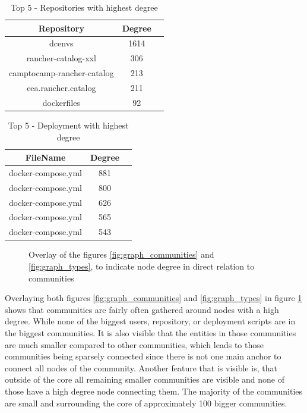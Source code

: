 \begin{table}[h!]
    \centering
    \begin{tabular}{ |c|c|c| }
    \hline
    Repository & Degree \\
    \hline
         dcenvs & 1614\\
         rancher-catalog-xxl & 306\\
         camptocamp-rancher-catalog & 213\\
         eea.rancher.catalog & 211\\
         dockerfiles & 92\\
    \hline
    \end{tabular}
    \caption{Top 5 - Repositories with highest degree}
    \label{table_top_repositories}
\end{table}

\begin{table}[h!]
    \centering
    \begin{tabular}{ |c|c|c| }
    \hline
    FileName & Degree \\
    \hline
         docker-compose.yml & 881\\
         docker-compose.yml & 800\\
         docker-compose.yml & 626\\
         docker-compose.yml & 565\\
         docker-compose.yml & 543\\
    \hline
    \end{tabular}
    \caption{Top 5 - Deployment with highest degree}
    \label{table_top_deployments}
\end{table}


\begin{figure}[]\centering
{}
    \caption{Overlay of the figures \ref{fig:graph_communities} and \ref{fig:graph_types}, to indicate node degree in direct relation to communities}
    \label{fig:graph_merged}
\end{figure}

Overlaying both figures \ref{fig:graph_communities} and \ref{fig:graph_types} in figure \ref{fig:graph_merged} shows that communities are fairly often gathered around nodes with a high degree. While none of the biggest users, repository, or deployment scripts are in the biggest communities. It is also visible that the entities in those communities are much smaller compared to other communities, which leads to those communities being sparsely connected since there is not one main anchor to connect all nodes of the community. Another feature that is visible is, that outside of the core all remaining smaller communities are visible and none of those have a high degree node connecting them. The majority of the communities are small and surrounding the core of approximately 100 bigger communities.

